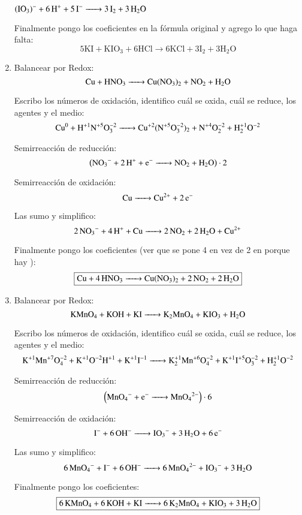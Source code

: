 \begin{enumerate}
\hfil$\ce{(IO3)^- + 6H^+ + 5 I^- -> 3I2 + 3H2O }$\hfil

Finalmente pongo los coeficientes en la fórmula original y agrego lo que haga falta:
\[\boxed{5\text{KI} + \text{K} \text{I} \text{O}_3 + 6\text{H} \text{Cl} \longrightarrow
6\text{KCl} + 3\text{I}_2 +  3\text{H}_2 \text{O}}\]


\newpage
\item
Balancear por Redox:
$$\ce{
Cu + HNO3 ->
Cu(NO3)2 + NO2 + H2O
}$$

Escribo los números de oxidación, identifico cuál se oxida, cuál se reduce, los agentes y el medio:
$$\ce{
Cu^0 + H^{+1}N^{+5}O^{-2}3 ->
Cu^{+2}(N^{+5}O^{-2}3)2 + N^{+4}O^{-2}2 + H^{+1}2O^{-2}
}$$


\begin{multicols}{2}
Semirreacción de reducción:
$$\left(\ce{
NO3^{-} + 2H^+ + e^- ->
NO2 + H2O
}\right)\cdot 2$$

Semirreacción de oxidación: 
$$\ce{
Cu ->
Cu^{2+} + 2e^-
}$$
\end{multicols}

Las sumo y simplifico:
$$\ce{
2NO3^{-} + 4H^+ + Cu ->
2NO2 + 2 H2O + Cu^{2+}
}$$

Finalmente pongo los coeficientes (ver que se pone 4 en vez de 2 en  porque hay ):
$$\fbox{\ce{
Cu + 4HNO3 ->
Cu(NO3)2 + 2NO2 + 2H2O
}}$$


\item
Balancear por Redox:
$$\ce{
KMnO4 + KOH + KI ->
K2MnO4 + KIO3 + H2O
}$$

Escribo los números de oxidación, identifico cuál se oxida, cuál se reduce, los agentes y el medio:
\[\ce{
K^{+1}Mn^{+7}O^{-2}4 + K^{+1}O^{-2}H^{+1} + K^{+1}I^{-1} ->
K^{+1}2Mn^{+6}O^{-2}4 + K^{+1}I^{+5}O^{-2}3 + H^{+1}2O^{-2}
}\]


\begin{multicols}{2}
Semirreacción de reducción:
$$\left(\ce{
MnO4^- +e^- ->
MnO4^{2-}
}\right)\cdot 6$$

Semirreacción de oxidación:
$$\ce{
I^{-} + 6OH^- ->
IO3^- + 3H2O + 6e^-
}$$
\end{multicols}

Las sumo y simplifico:
$$\ce{
6MnO4^- + I^- + 6OH^- ->
6MnO4^{2-} + IO3^- + 3H2O
}$$

Finalmente pongo los coeficientes:
$$\fbox{\ce{
6KMnO4 + 6KOH + KI ->
6K2MnO4 + KIO3 + 3H2O
}}$$



\end{enumerate}
